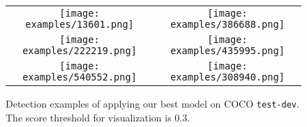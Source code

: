 \begin{figure*}[tbp]
	\centering
	\begin{tabular}{cc}
		\texttt{[image: examples/13601.png]}&
		\texttt{[image: examples/386688.png]}\\
		\texttt{[image: examples/222219.png]}&
		\texttt{[image: examples/435995.png]}\\
		\texttt{[image: examples/540552.png]}&
		\texttt{[image: examples/308940.png]}\\
	\end{tabular}
	\caption{Detection examples of applying our best model on COCO \texttt{test-dev}. The score threshold for visualization is 0.3.
	}\vspace{-2mm}
	\label{fig:example}
\end{figure*}








    
